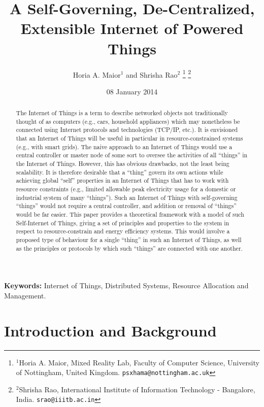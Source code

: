 \documentclass[letterpaper, 10 pt, conference]{ieeeconf}
\title{A Self-Governing, De-Centralized, Extensible Internet of Powered Things}
\author{Horia A. Maior$^{1}$ and Shrisha Rao$^{2}$%
\thanks{$^{1}$Horia A. Maior, Mixed Reality Lab, Faculty of Computer Science, University of Nottingham, United Kingdom.
        {\tt\small psxhama@nottingham.ac.uk}}%
\thanks{$^{2}$Shrisha Rao, International Institute of Information Technology - Bangalore, India.
        {\tt\small srao@iiitb.ac.in}}%
}
\begin{document}
\maketitle
\thispagestyle{empty}
\pagestyle{empty}




\date{08 January 2014}

\begin{abstract}
  The Internet of Things is a term to describe networked objects not traditionally thought of as computers (e.g., cars, household appliances) which may nonetheless be connected using Internet protocols and technologies (TCP/IP, etc.). It is envisioned that an Internet of Things will be useful in particular in resource-constrained systems (e.g., with smart grids). The naive approach to an Internet of Things would use a central controller or master node of some sort to oversee the activities of all ``things'' in the Internet of Things. However, this has obvious drawbacks, not the least being scalability. It is therefore desirable that a ``thing'' govern its own actions while achieving global ``self'' properties in an Internet of Things that has to work with resource constraints (e.g., limited allowable peak electricity usage for a domestic or industrial system of many ``things''). Such an Internet of Things with self-governing ``things'' would not require a central controller, and addition or removal of ``things'' would be far easier. This paper provides a theoretical framework with a model of such Self-Internet of Things, giving a set of principles and properties to the system in respect to resource-constrain and energy efficiency systems. This would involve a proposed type of behaviour for a single ``thing'' in such an Internet of Things, as well as the principles or protocols by which such ``things'' are connected with one another.
\end{abstract}

{\bf Keywords:} Internet of Things, Distributed Systems, Resource Allocation and Management.

\section{Introduction and Background}\label{intro}
\end{document}
